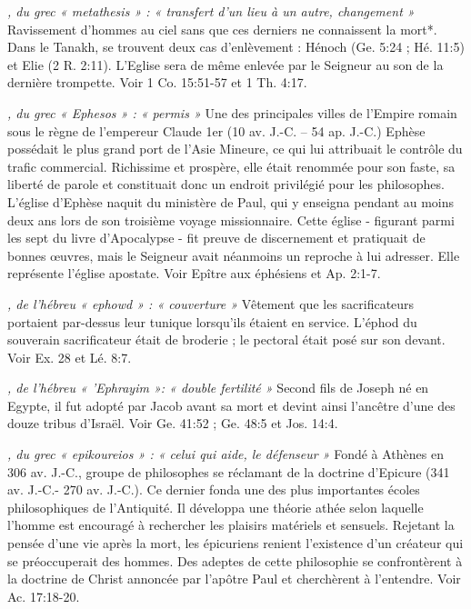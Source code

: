 \begin{multicols}{2}
{\textit{, du grec « metathesis » : « transfert d'un lieu à un autre, changement »}\newline
Ravissement d'hommes au ciel sans que ces derniers ne connaissent la mort*. Dans le Tanakh, se trouvent deux cas d'enlèvement : Hénoch (Ge. 5:24 ; Hé. 11:5) et Elie (2 R. 2:11). L'Eglise sera de même enlevée par le Seigneur au son de la dernière trompette. Voir 1 Co. 15:51-57 et 1 Th. 4:17.

\textit{, du grec « Ephesos » : « permis »}\newline
Une des principales villes de l'Empire romain sous le règne de l'empereur Claude 1er (10 av. J.-C. – 54 ap. J.-C.) Ephèse possédait le plus grand port de l'Asie Mineure, ce qui lui attribuait le contrôle du trafic commercial. Richissime et prospère, elle était renommée pour son faste, sa liberté de parole et constituait donc un endroit privilégié pour les philosophes. L'église d'Ephèse naquit du ministère de Paul, qui y enseigna pendant au moins deux ans lors de son troisième voyage missionnaire. Cette église - figurant parmi les sept du livre d'Apocalypse - fit preuve de discernement et pratiquait de bonnes œuvres, mais le Seigneur avait néanmoins un reproche à lui adresser. Elle représente l'église apostate. Voir Epître aux éphésiens et Ap. 2:1-7.

\textit{, de l'hébreu « ephowd » : « couverture »}\newline
Vêtement que les sacrificateurs portaient par-dessus leur tunique lorsqu'ils étaient en service. L'éphod du souverain sacrificateur était de broderie ; le pectoral était posé sur son devant. Voir Ex. 28 et Lé. 8:7.

\textit{, de l'hébreu « 'Ephrayim »: « double fertilité »}\newline
Second fils de Joseph né en Egypte, il fut adopté par Jacob avant sa mort et devint ainsi l'ancêtre d'une des douze tribus d'Israël. Voir Ge. 41:52 ; Ge. 48:5 et Jos. 14:4.

\textit{, du grec « epikoureios » : « celui qui aide, le défenseur »}\newline
Fondé à Athènes en 306 av. J.-C., groupe de philosophes se réclamant de la doctrine d'Epicure (341 av. J.-C.- 270 av. J.-C.). Ce dernier fonda une des plus importantes écoles philosophiques de l'Antiquité. Il développa une théorie athée selon laquelle l'homme est encouragé à rechercher les plaisirs matériels et sensuels. Rejetant la pensée d'une vie après la mort, les épicuriens renient l'existence d'un créateur qui se préoccuperait des hommes. Des adeptes de cette philosophie se confrontèrent à la doctrine de Christ annoncée par l'apôtre Paul et cherchèrent à l'entendre. Voir Ac. 17:18-20.

}
\end{multicols}
